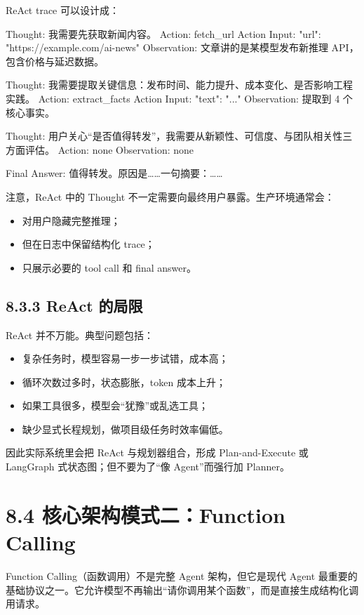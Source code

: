 ReAct trace 可以设计成：


\begin{codeblock}
Thought: 我需要先获取新闻内容。
Action: fetch_url
Action Input: {"url": "https://example.com/ai-news"}
Observation: 文章讲的是某模型发布新推理 API，包含价格与延迟数据。

Thought: 我需要提取关键信息：发布时间、能力提升、成本变化、是否影响工程实践。
Action: extract_facts
Action Input: {"text": "..."}
Observation: 提取到 4 个核心事实。

Thought: 用户关心``是否值得转发''，我需要从新颖性、可信度、与团队相关性三方面评估。
Action: none
Observation: none

Final Answer: 值得转发。原因是……一句摘要：……
\end{codeblock}

注意，ReAct 中的 Thought 不一定需要向最终用户暴露。生产环境通常会：


\begin{itemize}[leftmargin=2em]
\item 对用户隐藏完整推理；
\item 但在日志中保留结构化 trace；
\item 只展示必要的 tool call 和 final answer。
\end{itemize}

\subsection{8.3.3 ReAct 的局限}

ReAct 并不万能。典型问题包括：


\begin{itemize}[leftmargin=2em]
\item 复杂任务时，模型容易一步一步试错，成本高；
\item 循环次数过多时，状态膨胀，token 成本上升；
\item 如果工具很多，模型会``犹豫''或乱选工具；
\item 缺少显式长程规划，做项目级任务时效率偏低。
\end{itemize}

因此实际系统里会把 ReAct 与规划器组合，形成 Plan-and-Execute 或 LangGraph 式状态图；但不要为了``像 Agent''而强行加 Planner。


\section{8.4 核心架构模式二：Function Calling}

Function Calling（函数调用）不是完整 Agent 架构，但它是现代 Agent 最重要的基础协议之一。它允许模型不再输出``请你调用某个函数''，而是直接生成结构化调用请求。


